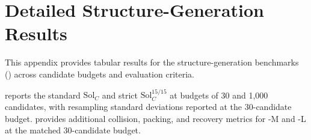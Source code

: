 \section{Detailed Structure-Generation Results}
\label{app:structure-generation-results}

This appendix provides tabular results for the structure-generation benchmarks () across candidate budgets and evaluation criteria.

 reports the standard $\mathrm{Sol}_C$ and strict
$\mathrm{Sol}_C^{15/15}$ at budgets of 30 and 1{,}000 candidates, with
resampling standard deviations reported at the 30-candidate budget.
 provides additional collision, packing, and
recovery metrics for \model{}-M and \model{}-L at the matched 30-candidate
budget.




